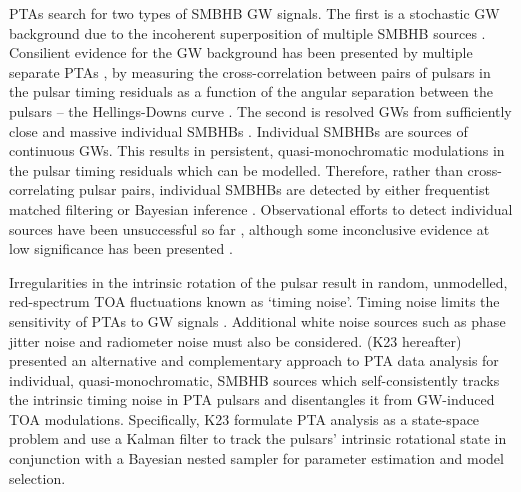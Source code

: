 \documentclass[fleqn,usenatbib,useAMS]{mnras}
\begin{document}
 
 
 PTAs search for two types of SMBHB GW signals. The first is a stochastic GW background due to the incoherent superposition of multiple SMBHB sources \citep{Allen1997,Sesana10,Christensen2019,Renzini2022}. Consilient evidence for the GW background has been presented by multiple separate PTAs \citep{2023ApJ...951L...8A,2023arXiv230616214A,2023ApJ...951L...6R,2023RAA....23g5024X}, by measuring the cross-correlation between pairs of pulsars in the pulsar timing residuals as a function of the angular separation between the pulsars -- the Hellings-Downs curve \citep{Hellings}. The second is resolved GWs from sufficiently close and massive individual SMBHBs \citep{Sesana2010,Yardley2010,Zhu10,Babak2012,2013CQGra..30v4004E,Zhupulsarterms}. Individual SMBHBs are sources of continuous GWs. This results in persistent, quasi-monochromatic modulations in the pulsar timing residuals which can be modelled. Therefore, rather than cross-correlating pulsar pairs, individual SMBHBs are detected by either frequentist matched filtering \citep{Lee2011MNRAS.414.3251L, Ellis2012ApJ,Zhu2014PPTA} or Bayesian inference \citep{Ellis2016,Arzoumanian2020A}. Observational efforts to detect individual sources have been unsuccessful so far \citep{Jenet2004,Zhu2014PPTA,Babak2016,Arzoumanian2023}, although some inconclusive evidence at low significance has been presented \citep{2023arXiv230616226A}. \newline 
  
  
  
 Irregularities in the intrinsic rotation of the pulsar result in random, unmodelled, red-spectrum TOA fluctuations known as `timing noise'. Timing noise limits the sensitivity of PTAs to GW signals \citep{Shannon2010,Lasky2015,Caballero2016,Goncharov2021}. Additional white noise sources such as phase jitter noise and radiometer noise \citep{Cordes2010,Lam2019,Parthasarathy2021} must also be considered. \cite{K1} (K23 hereafter) presented an alternative and complementary approach to PTA data analysis for individual, quasi-monochromatic, SMBHB sources which self-consistently tracks the intrinsic timing noise in PTA pulsars and disentangles it from GW-induced TOA modulations. Specifically, K23 formulate PTA analysis as a state-space problem and use a Kalman filter \citep{Kalman1} to track the pulsars' intrinsic rotational state in conjunction with a Bayesian nested sampler \citep{Skilling, Ashton2022} for parameter estimation and model selection. \newline 
 
\end{document}
